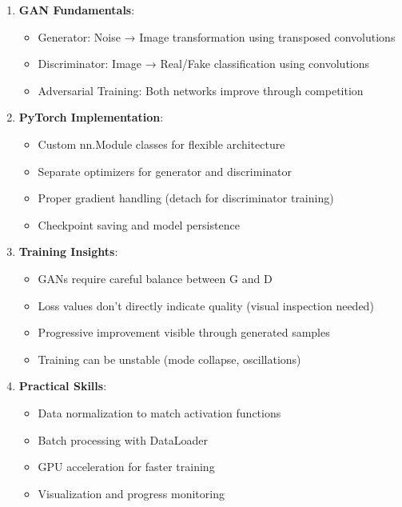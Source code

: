 \documentclass[11pt]{article}
\providecommand{\tightlist}{%
      \setlength{\itemsep}{0pt}\setlength{\parskip}{0pt}}
\begin{document}
\begin{enumerate}
\def\labelenumi{\arabic{enumi}.}
\tightlist
\item
  \textbf{GAN Fundamentals}:

  \begin{itemize}
  \tightlist
  \item
    Generator: Noise → Image transformation using transposed
    convolutions
  \item
    Discriminator: Image → Real/Fake classification using convolutions
  \item
    Adversarial Training: Both networks improve through competition
  \end{itemize}
\item
  \textbf{PyTorch Implementation}:

  \begin{itemize}
  \tightlist
  \item
    Custom nn.Module classes for flexible architecture
  \item
    Separate optimizers for generator and discriminator
  \item
    Proper gradient handling (detach for discriminator training)
  \item
    Checkpoint saving and model persistence
  \end{itemize}
\item
  \textbf{Training Insights}:

  \begin{itemize}
  \tightlist
  \item
    GANs require careful balance between G and D
  \item
    Loss values don't directly indicate quality (visual inspection
    needed)
  \item
    Progressive improvement visible through generated samples
  \item
    Training can be unstable (mode collapse, oscillations)
  \end{itemize}
\item
  \textbf{Practical Skills}:

  \begin{itemize}
  \tightlist
  \item
    Data normalization to match activation functions
  \item
    Batch processing with DataLoader
  \item
    GPU acceleration for faster training
  \item
    Visualization and progress monitoring
  \end{itemize}
\end{enumerate}
\end{document}
